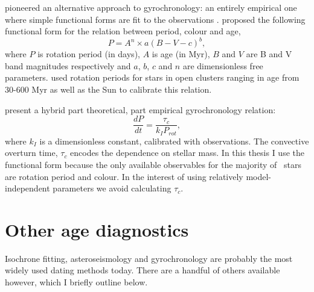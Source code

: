 \citet{Barnes2003} pioneered an alternative approach to gyrochronology: an
entirely empirical one where simple functional forms are fit to the
observations \citep[\eg][]{Barnes2007, Mamajek2008}.
\citet{Barnes2003} proposed the following functional form for the relation
between period, colour and age,
\begin{equation}
P = A^n \times a(B-V-c)^b,
\end{equation}
\label{eq:Barnes2007_2}
where $P$ is rotation period (in days),
$A$ is age (in Myr), $B$ and $V$ are B and V band magnitudes respectively and
$a$, $b$, $c$ and $n$ are dimensionless free parameters.
\citet{Barnes2007} used rotation periods for stars in open clusters ranging in
age from 30-600 Myr as well as the Sun to calibrate this relation.

\citet{Barnes2010b} present a hybrid part theoretical, part empirical
gyrochronology relation:
\begin{equation}
\frac{dP}{dt} = \frac{\tau_c}{k_IP_{rot}},
\end{equation}
where $k_I$ is a dimensionless constant, calibrated with observations.
The convective overturn time, $\tau_c$ encodes the dependence on stellar mass.
In this thesis I use the \citet{Barnes2003} functional form because the only
available observables for the majority of \kepler\ stars are rotation period
and colour.
In the interest of using relatively model-independent parameters we avoid
calculating $\tau_c$.

\section{Other age diagnostics}
\label{sec:activity}

Isochrone fitting, asteroseismology and gyrochronology are probably the most
widely used dating methods today.
There are a handful of others available however, which I briefly outline
below.

